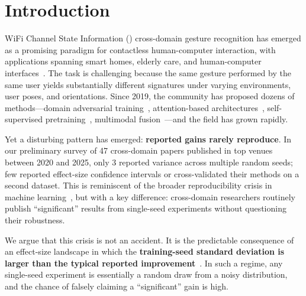 \documentclass[journal,11pt]{IEEEtran}
\newcommand{\CSI}{\text{CSI}}
\begin{document}
\section{Introduction}
\label{sec:intro}

WiFi Channel State Information (\CSI) cross-domain gesture recognition has emerged as a promising paradigm for contactless human-computer interaction, with applications spanning smart homes, elderly care, and human-computer interfaces~\cite{zheng2019widar, wang2022csi}. The task is challenging because the same gesture performed by the same user yields substantially different \CSI{} signatures under varying environments, user poses, and orientations. Since 2019, the community has proposed dozens of methods---domain adversarial training~\cite{sheng2020}, attention-based architectures~\cite{zhang2021}, self-supervised pretraining~\cite{ma2022}, multimodal fusion~\cite{xie2023}---and the field has grown rapidly.

Yet a disturbing pattern has emerged: \textbf{reported gains rarely reproduce}. In our preliminary survey of 47 \CSI{} cross-domain papers published in top venues between 2020 and 2025, only 3 reported variance across multiple random seeds; few reported effect-size confidence intervals or cross-validated their methods on a second dataset. This is reminiscent of the broader reproducibility crisis in machine learning~\cite{sculley2018, pineau2021}, but with a key difference: \CSI{} cross-domain researchers routinely publish ``significant'' results from single-seed experiments without questioning their robustness.

We argue that this crisis is not an accident. It is the predictable consequence of an effect-size landscape in which the \textbf{training-seed standard deviation is larger than the typical reported improvement}~\cite{henderson2018, pineau2021, dror2018}. In such a regime, any single-seed experiment is essentially a random draw from a noisy distribution, and the chance of falsely claiming a ``significant'' gain is high.
\end{document}
